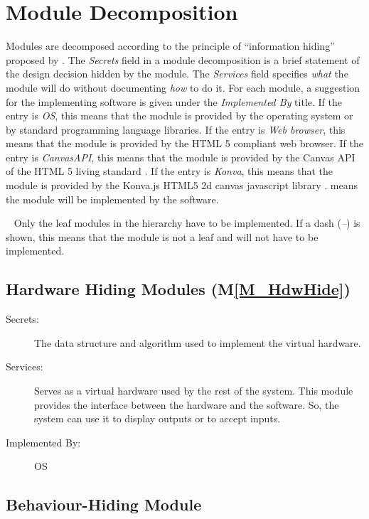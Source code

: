 \documentclass[12pt, titlepage]{article}
\newcommand{\mref}[1]{M\ref{#1}}
\begin{document}
\section{Module Decomposition} \label{SecMD}

Modules are decomposed according to the principle of ``information hiding''
proposed by \citet{ParnasEtAl1984}. The \emph{Secrets} field in a module
decomposition is a brief statement of the design decision hidden by the
module. The \emph{Services} field specifies \emph{what} the module will do
without documenting \emph{how} to do it. For each module, a suggestion for the
implementing software is given under the \emph{Implemented By} title. If the
entry is \emph{OS}, this means that the module is provided by the operating
system or by standard programming language libraries.
If the entry is \emph{Web browser}, this means that the module is provided by the 
HTML 5 compliant web browser.
If the entry is \emph{CanvasAPI}, this means that the module is provided by the 
Canvas API of the HTML 5 living standard \cite{html_std_canvas}.
If the entry is \emph{Konva}, this means that the module is provided by the 
Konva.js HTML5 2d canvas javascript library \cite{konva_2021}.
\emph{\progname{}} means the module will be implemented by the \progname{} software.

~\newline
Only the leaf modules in the hierarchy have to be implemented. If a dash
(\emph{--}) is shown, this means that the module is not a leaf and will not have
to be implemented.

\subsection{Hardware Hiding Modules (\mref{M_HdwHide})}

\begin{description}
\item[Secrets:]The data structure and algorithm used to implement the virtual
  hardware.
\item[Services:]Serves as a virtual hardware used by the rest of the
  system. This module provides the interface between the hardware and the
  software. So, the system can use it to display outputs or to accept inputs.
\item[Implemented By:] OS
\end{description}

\subsection{Behaviour-Hiding Module}
\end{document}
